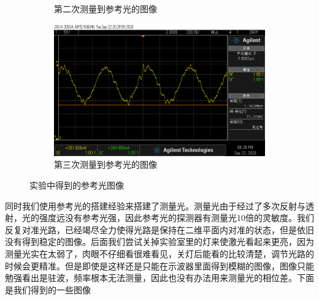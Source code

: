 \documentclass{ctexart}
\begin{document}
\begin{figure}[H]
\begin{subfigure}{.32\textwidth}
    \caption{第二次测量到参考光的图像}
  \end{subfigure}
  \begin{subfigure}{.32\textwidth}
    \centering
    \includegraphics[width=\linewidth]{双频激光干涉装置图像/参考光3}
    \caption{第三次测量到参考光的图像}
  \end{subfigure}
  \caption{实验中得到的参考光图像}
\end{figure}

同时我们使用参考光的搭建经验来搭建了测量光。测量光由于经过了多次反射与透射，光的强度远没有参考光强，因此参考光的探测器有测量光10倍的灵敏度。我们反复对准光路，已经竭尽全力使得光路是保持在二维平面内对准的状态，但是依旧没有得到稳定的图像。后面我们尝试关掉实验室里的灯来使激光看起来更亮，因为测量光实在太弱了，肉眼不仔细看很难看见，关灯后能看的比较清楚，调节光路的时候会更精准。但是即使是这样还是只能在示波器里面得到模糊的图像，图像只能勉强看出是驻波，频率根本无法测量，因此也没有办法用来测量光的相位差。下面是我们得到的一些图像
\end{document}

